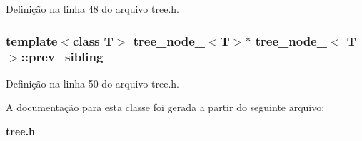 Definição na linha 48 do arquivo tree.\+h.

\subsubsection[{prev\+\_\+sibling}]{\setlength{\rightskip}{0pt plus 5cm}template$<$class T$>$ {\bf tree\+\_\+node\+\_\+}$<$T$>$$\ast$ {\bf tree\+\_\+node\+\_\+}$<$ T $>$\+::prev\+\_\+sibling}\label{classtree__node___ae7b8325f91c0b4460552cef6b9aec159}


Definição na linha 50 do arquivo tree.\+h.



A documentação para esta classe foi gerada a partir do seguinte arquivo\+:\begin{DoxyCompactItemize}
\item 
{\bf tree.\+h}\end{DoxyCompactItemize}
